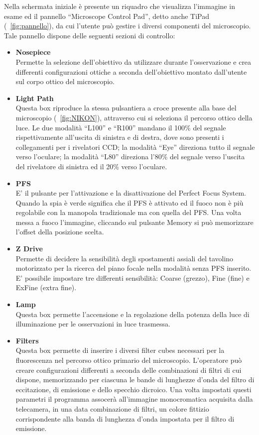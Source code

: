 Nella schermata iniziale è presente un riquadro che visualizza l'immagine in esame ed il pannello ``Microscope Control Pad'', detto anche TiPad (\figurename~\ref{fig:pannello}), da cui l'utente può gestire i diversi componenti del microscopio. 
Tale pannello dispone delle seguenti sezioni di controllo:

\begin{itemize}
\item \textbf{Nosepiece}\\
Permette la selezione dell'obiettivo da utilizzare durante l'osservazione e crea differenti configurazioni ottiche a seconda dell'obiettivo montato dall'utente sul corpo ottico del microscopio.

\item \textbf{Light Path}\\
Questa box riproduce la stessa pulsantiera a croce presente alla base del microscopio (\figurename~\ref{fig:NIKON}), attraverso cui si seleziona il percorso ottico della luce. 
Le due modalità ``L100'' e ``R100'' mandano il 100\% del segnale rispettivamente all'uscita di sinistra e di destra, dove sono presenti i collegamenti per i rivelatori CCD; la modalità ``Eye'' direziona tutto il segnale verso l'oculare; la modalità ``L80'' direziona l'80\% del segnale verso l'uscita del rivelatore di sinistra ed il 20\% verso l'oculare.

\item \textbf{PFS}\\
E' il pulsante per l'attivazione e la disattivazione del Perfect Focus System. 
Quando la spia è verde significa che il PFS è attivato ed il fuoco non è più regolabile con la manopola tradizionale ma con quella del PFS. 
Una volta messa a fuoco l'immagine, cliccando sul pulsante Memory si può memorizzare l'offset della posizione scelta.

\item \textbf{Z Drive}\\
Permette di decidere la sensibilità degli spostamenti assiali del tavolino motorizzato per la ricerca del piano focale nella modalità senza PFS inserito.
E' possibile impostare tre differenti sensibilità: Coarse (grezzo), Fine (fine) e ExFine (extra fine).

\item \textbf{Lamp}\\
Questa box permette l'accensione e la regolazione della potenza della luce di illuminazione per le osservazioni in luce trasmessa.

\item \textbf{Filters}\\
Questa box permette di inserire i diversi filter cubes necessari per la fluorescenza nel percorso ottico primario del microscopio.
L'operatore può creare configurazioni differenti a seconda delle combinazioni di filtri di cui dispone, memorizzando per ciascuna le bande di lunghezze d'onda del filtro di eccitazione, di emissione e dello specchio dicroico.
Una volta impostati questi parametri il programma assocerà all'immagine monocromatica acquisita dalla telecamera, in una data combinazione di filtri, un colore fittizio corrispondente alla banda di lunghezza d'onda impostata per il filtro di emissione.
\end{itemize}

